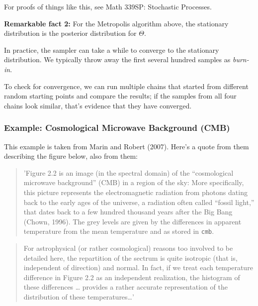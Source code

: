 \documentclass[]{article}
\begin{document}
For proofs of things like this, see Math 339SP: Stochastic Processes.

\textbf{Remarkable fact 2:} For the Metropolis algorithm above, the
stationary distribution is the posterior distribution for \(\Theta\).

In practice, the sampler can take a while to converge to the stationary
distribution. We typically throw away the first several hundred samples
as \emph{burn-in}.

To check for convergence, we can run multiple chains that started from
different random starting points and compare the results; if the samples
from all four chains look similar, that's evidence that they have
converged.

\subsubsection{Example: Cosmological Microwave Background
(CMB)}\label{example-cosmological-microwave-background-cmb}

This example is taken from Marin and Robert (2007). Here's a quote from
them describing the figure below, also from them:

\begin{quote}
'Figure 2.2 is an image (in the spectral domain) of the ``cosmological
microwave background'' (CMB) in a region of the sky: More specifically,
this picture represents the electromagnetic radiation from photons
dating back to the early ages of the universe, a radiation often called
``fossil light,'' that dates back to a few hundred thousand years after
the Big Bang (Chown, 1996). The grey levels are given by the differences
in apparent temperature from the mean temperature and as stored in
\texttt{cmb}.
\end{quote}

\begin{quote}
For astrophysical (or rather cosmological) reasons too involved to be
detailed here, the repartition of the sectrum is quite isotropic (that
is, independent of direction) and normal. In fact, if we treat each
temperature difference in Figure 2.2 as an independent realization, the
histogram of these differences \ldots{} provides a rather accurate
representation of the distribution of these temperatures\ldots{}'
\end{quote}
\end{document}
